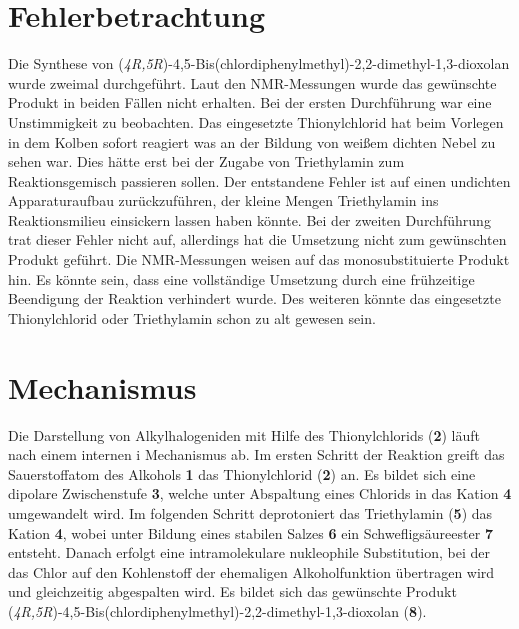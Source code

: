\documentclass[12pt]{article}
\begin{document}
\begin{onehalfspace}
\section{Fehlerbetrachtung}

Die Synthese von (\textit{4R,5R})-4,5-Bis(chlordiphenylmethyl)-2,2-dimethyl-1,3-dioxolan wurde zweimal durchgeführt. 
Laut den NMR-Messungen wurde das gewünschte Produkt in beiden Fällen nicht erhalten.
Bei der ersten Durchführung war eine Unstimmigkeit zu beobachten. 
Das eingesetzte Thionylchlorid hat beim Vorlegen in dem Kolben sofort reagiert was an der Bildung von weißem dichten Nebel zu sehen war. Dies hätte erst bei der Zugabe von Triethylamin zum Reaktionsgemisch passieren sollen. Der entstandene Fehler ist auf einen undichten Apparaturaufbau zurückzuführen, der kleine Mengen Triethylamin ins Reaktionsmilieu einsickern lassen haben könnte. 
Bei der zweiten Durchführung trat dieser Fehler nicht auf, allerdings hat die Umsetzung nicht zum gewünschten Produkt geführt.
Die NMR-Messungen weisen auf das monosubstituierte Produkt hin. Es könnte sein, dass eine vollständige Umsetzung durch eine frühzeitige Beendigung der Reaktion verhindert wurde. Des weiteren könnte das eingesetzte Thionylchlorid oder Triethylamin schon zu alt gewesen sein.

\section{Mechanismus\cite{organikum}}
Die Darstellung von Alkylhalogeniden mit Hilfe des Thionylchlorids (\textbf{2}) läuft nach einem internen i Mechanismus ab.
Im ersten Schritt der Reaktion greift das Sauerstoffatom des Alkohols \textbf{1} das Thionylchlorid (\textbf{2}) an. Es bildet sich eine dipolare Zwischenstufe \textbf{3}, welche unter Abspaltung eines Chlorids in das Kation \textbf{4} umgewandelt wird. Im folgenden Schritt deprotoniert das Triethylamin (\textbf{5}) das Kation \textbf{4}, wobei unter Bildung eines stabilen Salzes \textbf{6} ein Schwefligsäureester \textbf{7} entsteht. 
Danach erfolgt eine intramolekulare nukleophile Substitution, bei der das Chlor auf den Kohlenstoff der ehemaligen Alkoholfunktion übertragen wird und gleichzeitig  abgespalten wird. Es bildet sich  das gewünschte Produkt (\textit{4R,5R})-4,5-Bis(chlordiphenylmethyl)-2,2-dimethyl-1,3-dioxolan (\textbf{8}).\\


\end{onehalfspace}
\end{document}
